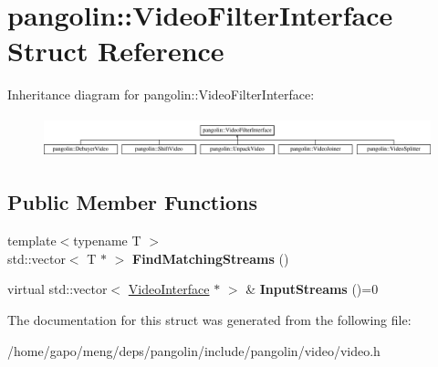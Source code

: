 \hypertarget{structpangolin_1_1_video_filter_interface}{}\section{pangolin\+:\+:Video\+Filter\+Interface Struct Reference}
\label{structpangolin_1_1_video_filter_interface}
Inheritance diagram for pangolin\+:\+:Video\+Filter\+Interface\+:\begin{figure}[H]
\begin{center}
\leavevmode
\includegraphics[height=1.204301cm]{structpangolin_1_1_video_filter_interface}
\end{center}
\end{figure}
\subsection*{Public Member Functions}
\begin{DoxyCompactItemize}
\item 
{\footnotesize template$<$typename T $>$ }\\std\+::vector$<$ T $\ast$ $>$ {\bfseries Find\+Matching\+Streams} ()\hypertarget{structpangolin_1_1_video_filter_interface_a1569261529aff5bb99ac2bd2ea0b631f}{}\label{structpangolin_1_1_video_filter_interface_a1569261529aff5bb99ac2bd2ea0b631f}

\item 
virtual std\+::vector$<$ \hyperlink{structpangolin_1_1_video_interface}{Video\+Interface} $\ast$ $>$ \& {\bfseries Input\+Streams} ()=0\hypertarget{structpangolin_1_1_video_filter_interface_ad6f58ea1f0d24adc184882ffa04e1501}{}\label{structpangolin_1_1_video_filter_interface_ad6f58ea1f0d24adc184882ffa04e1501}

\end{DoxyCompactItemize}


The documentation for this struct was generated from the following file\+:\begin{DoxyCompactItemize}
\item 
/home/gapo/meng/deps/pangolin/include/pangolin/video/video.\+h\end{DoxyCompactItemize}
